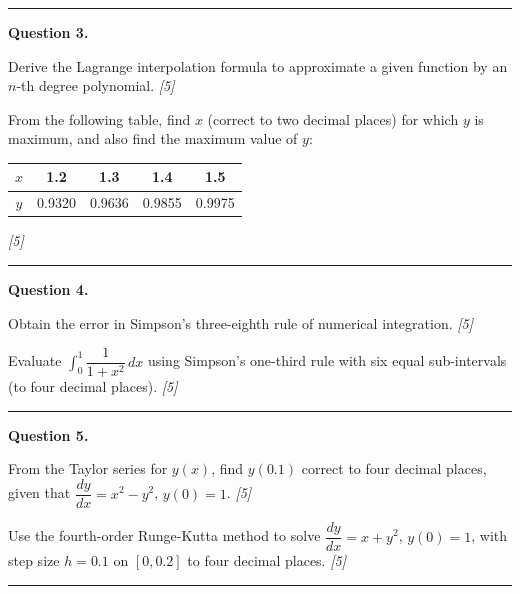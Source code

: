 \documentclass[11pt,a4paper]{article}
\newcommand{\pts}[1]{\hfill   \textit{[#1]}}
\begin{document}
\medskip\rule{\linewidth}{0.2pt}

\medskip


\noindent   \textbf{Question 3.}

\begin{parts}
  \item Derive the Lagrange interpolation formula to approximate a given function by an $n$-th degree polynomial. \pts{5}
  \item From the following table, find $x$ (correct to two decimal places) for which $y$ is maximum, and also find the maximum value of $y$:
  
\begin{center}
  
\begin{tabular}{|c|c|c|c|c|}\hline
  $x$ & 1.2 & 1.3 & 1.4 & 1.5 \\\hline
  $y$ & 0.9320 & 0.9636 & 0.9855 & 0.9975 \\\hline
  \end{tabular}
  \end{center} \pts{5}
\end{parts}

\medskip\rule{\linewidth}{0.2pt}

\medskip


\noindent   \textbf{Question 4.}

\begin{parts}
  \item Obtain the error in Simpson's three-eighth rule of numerical integration. \pts{5}
  \item Evaluate $\int_0^1 \dfrac{1}{1 + x^2}\,dx$ using Simpson's one-third rule with six equal sub-intervals (to four decimal places). \pts{5}
\end{parts}

\medskip\rule{\linewidth}{0.2pt}

\medskip


\noindent   \textbf{Question 5.}

\begin{parts}
  \item From the Taylor series for $y(x)$, find $y(0.1)$ correct to four decimal places, given that $\dfrac{dy}{dx} = x^2 - y^2$, $y(0) = 1$. \pts{5}
  \item Use the fourth-order Runge-Kutta method to solve $\dfrac{dy}{dx} = x + y^2$, $y(0) = 1$, with step size $h = 0.1$ on $[0, 0.2]$ to four decimal places. \pts{5}
\end{parts}

\medskip\rule{\linewidth}{0.2pt}
\end{document}
